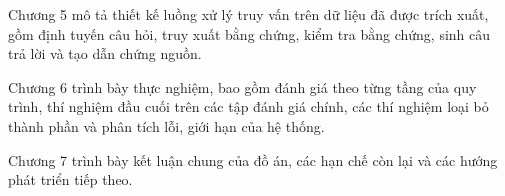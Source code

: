 \documentclass[../DoAn.tex]{subfiles}
\begin{document}
Chương 5 mô tả thiết kế luồng xử lý truy vấn trên dữ liệu đã được trích xuất, gồm định tuyến câu hỏi, truy xuất bằng chứng, kiểm tra bằng chứng, sinh câu trả lời và tạo dẫn chứng nguồn.

Chương 6 trình bày thực nghiệm, bao gồm đánh giá theo từng tầng của quy trình, thí nghiệm đầu cuối trên các tập đánh giá chính, các thí nghiệm loại bỏ thành phần và phân tích lỗi, giới hạn của hệ thống.



Chương 7 trình bày kết luận chung của đồ án, các hạn chế còn lại và các hướng phát triển tiếp theo.
\end{document}
